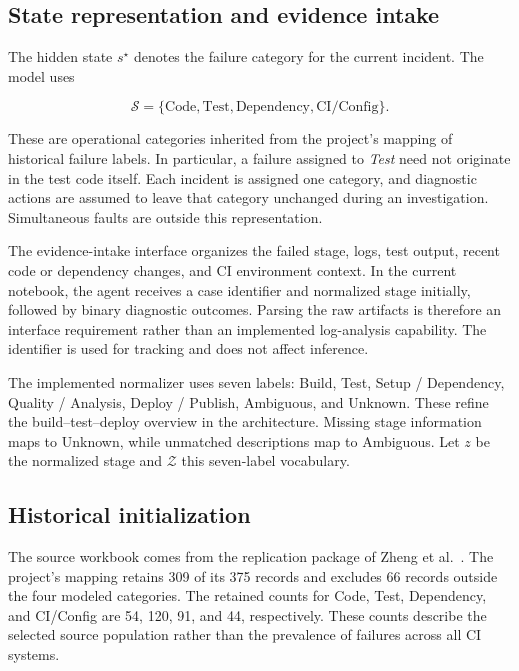 \documentclass{article}
\begin{document}
\subsection{State representation and evidence intake}

The hidden state $s^\star$ denotes the failure category for the current
incident. The model uses

\begin{equation}
\mathcal{S}=\{\text{Code},\text{Test},\text{Dependency},\text{CI/Config}\}.
\label{eq:agent_states}
\end{equation}

These are operational categories inherited from the project's mapping of
historical failure labels. In particular, a failure assigned to
\textit{Test} need not originate in the test code itself. Each incident is
assigned one category, and diagnostic actions are assumed to leave that
category unchanged during an investigation. Simultaneous faults are outside
this representation.

The evidence-intake interface organizes the failed stage, logs, test output,
recent code or dependency changes, and CI environment context. In the
current notebook, the agent receives a case identifier and normalized stage
initially, followed by binary diagnostic outcomes. Parsing the raw artifacts
is therefore an interface requirement rather than an implemented log-analysis
capability. The identifier is used for tracking and does not affect inference.

The implemented normalizer uses seven labels: Build, Test, Setup / Dependency,
Quality / Analysis, Deploy / Publish, Ambiguous, and Unknown. These refine the
build--test--deploy overview in the architecture. Missing stage information
maps to Unknown, while unmatched descriptions map to Ambiguous. Let $z$ be
the normalized stage and $\mathcal{Z}$ this seven-label vocabulary.

\subsection{Historical initialization}

The source workbook comes from the replication package of Zheng
et al.~\cite{Zheng2026WorkflowFailures}. The project's mapping retains 309
of its 375 records and excludes 66 records outside the four modeled
categories. The retained counts for Code, Test, Dependency, and CI/Config
are 54, 120, 91, and 44, respectively. These counts describe the selected
source population rather than the prevalence of failures across all CI
systems.
\end{document}
